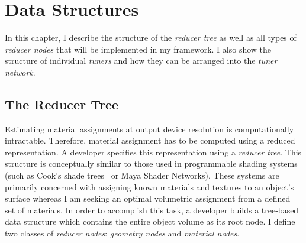 \chapter{Data Structures}
\label{chap:struct}
In this chapter, I describe the structure of the \emph{reducer tree} as well as all types of \emph{reducer nodes} that will be implemented in my framework. I also show the structure of individual \emph{tuners} and how they can be arranged into the \emph{tuner network}.

\section{The Reducer Tree}
Estimating material assignments at output device resolution is computationally intractable.
Therefore, material assignment has to be computed using a reduced representation.
A developer specifies this representation using a \emph{reducer tree}.
This structure is conceptually similar to those used in programmable shading systems
(such as Cook's shade trees~ or Maya Shader Networks).
These systems are primarily concerned with assigning known materials and textures to an object's surface
whereas I am seeking an optimal volumetric assignment from a defined set of materials. 
In order to accomplish this task, a developer builds a tree-based data structure
which contains the entire object volume as its root node.
I define two classes of \emph{reducer nodes}: \emph{geometry nodes} and \emph{material nodes}.


